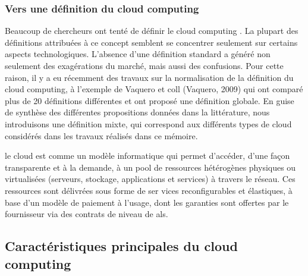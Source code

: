 \subsubsection{Vers une définition du cloud computing }
Beaucoup de chercheurs ont tenté de définir le cloud computing \parencite{Geelan}. La plupart des définitions attribuées à ce concept semblent se concentrer seulement sur certains aspects technologiques. L'absence d'une définition standard a généré non seulement des exagérations du marché, mais aussi des confusions. Pour cette raison, il y a eu récemment des travaux sur la normalisation de la définition du cloud computing, à l'exemple de Vaquero et coll (Vaquero, 2009) qui ont comparé plus de 20 définitions différentes et ont proposé une définition globale.  En guise de synthèse des différentes propositions données dans la littérature, nous introduisons une définition mixte, qui correspond aux différents types de cloud considérés dans les travaux réalisés dans ce mémoire.

\begin{defn}
  le cloud est comme un modèle informatique qui permet d’accéder, d’une façon transparente et à la demande, à un pool de ressources hétérogènes physiques ou virtualisées (serveurs, stockage, applications et services) à travers le réseau. Ces ressources sont délivrées sous forme de ser vices reconfigurables et élastiques, à base d’un modèle de paiement à l’usage, dont les garanties sont offertes par le fournisseur via des contrats de niveau de  \ac{als}. 
\end{defn}
%
%    
%
    \subsection{Caractéristiques principales du cloud computing}
% 
